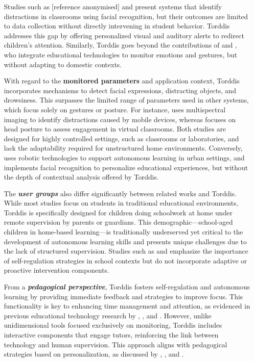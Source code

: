                 Studies such as [reference anonymised] and \cite{Nguyen2019} present systems that identify distractions in classrooms using facial recognition, but their outcomes are limited to data collection without directly intervening in student behavior. Torddis addresses this gap by offering personalized visual and auditory alerts to redirect children's attention. Similarly, Torddis goes beyond the contributions of \cite{Ozdamli2022} and \cite{VilliersRader2021}, who integrate educational technologies to monitor emotions and gestures, but without adapting to domestic contexts.
                
                With regard to the \textbf{monitored parameters} and application context, Torddis incorporates mechanisms to detect facial expressions, distracting objects, and drowsiness. This surpasses the limited range of parameters used in other systems, which focus solely on gestures or posture. For instance, \cite{Campbell2015Using} uses multispectral imaging to identify distractions caused by mobile devices, whereas \cite{Ucar2022Recognizing} focuses on head posture to assess engagement in virtual classrooms. Both studies are designed for highly controlled settings, such as classrooms or laboratories, and lack the adaptability required for unstructured home environments. Conversely, \cite{DaCosta2023} uses robotic technologies to support autonomous learning in urban settings, and \cite{Boumiza2017} implements facial recognition to personalize educational experiences, but without the depth of contextual analysis offered by Torddis.
                
                The \textbf{\textit{user groups}} also differ significantly between related works and Torddis. While most studies focus on students in traditional educational environments, Torddis is specifically designed for children doing schoolwork at home under remote supervision by parents or guardians. This demographic—school-aged children in home-based learning—is traditionally underserved yet critical to the development of autonomous learning skills and presents unique challenges due to the lack of structured supervision. Studies such as \cite{Roberts2020Task} and \cite{Muljana2022Instructional} emphasize the importance of self-regulation strategies in school contexts but do not incorporate adaptive or proactive intervention components.
                
                From a \textbf{\textit{pedagogical perspective}}, Torddis fosters self-regulation and autonomous learning by providing immediate feedback and strategies to improve focus. This functionality is key to enhancing time management and attention, as evidenced in previous educational technology research by \cite{Palmer2022impact}, \cite{Roberts2020Task}, and \cite{Wang2022Empowering}. However, unlike unidimensional tools focused exclusively on monitoring, Torddis includes interactive components that engage tutors, reinforcing the link between technology and human supervision. This approach aligns with pedagogical strategies based on personalization, as discussed by \cite{Salter2014Exploring}, \cite{Bembich2016Future}, and \cite{Adcroft2018Developing}.
                
